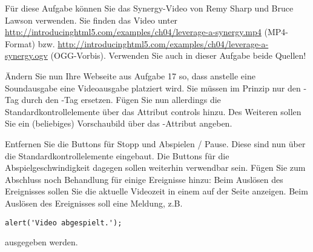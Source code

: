 %
\par Für diese Aufgabe können Sie das Synergy-Video von Remy Sharp und Bruce
Lawson verwenden. Sie finden das Video unter
\url{http://introducinghtml5.com/examples/ch04/leverage-a-synergy.mp4}
(MP4-Format) bzw. 
\url{http://introducinghtml5.com/examples/ch04/leverage-a-synergy.ogv}
(OGG-Vorbis). Verwenden Sie auch in dieser Aufgabe beide Quellen!
%
\par Ändern Sie nun Ihre Webseite aus Aufgabe 17 so, dass anstelle eine
Soundausgabe eine Videoausgabe platziert wird. Sie müssen im Prinzip nur den
-Tag durch den -Tag ersetzen. Fügen Sie nun allerdings
die Standardkontrollelemente über das Attribut controls hinzu. Des Weiteren
sollen Sie ein (beliebiges) Vorschaubild über das -Attribut
angeben.
%
\par Entfernen Sie die Buttons für Stopp und Abspielen / Pause. Diese sind nun
über die Standardkontrollelemente eingebaut. Die Buttons für die
Abspielgeschwindigkeit dagegen sollen weiterhin verwendbar sein. Fügen Sie zum
Abschluss noch Behandlung für einige Ereignisse hinzu: Beim Auslösen des
 Ereignisses sollen Sie die aktuelle Videozeit in einem
 auf der Seite anzeigen. Beim Auslösen des  Ereignisses
soll eine Meldung, z.B.
%
\begin{lstlisting}
alert('Video abgespielt.');
\end{lstlisting}
%
ausgegeben werden.
